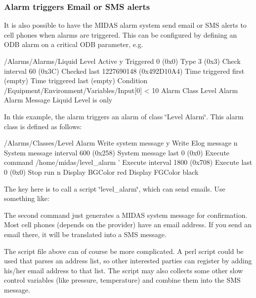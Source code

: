 \par


\par
\hypertarget{RC_customize_ODB_RC_alarms_email}{}\subsubsection{Alarm triggers Email or SMS alerts}\label{RC_customize_ODB_RC_alarms_email}
It is also possible to have the MIDAS alarm system send email or SMS alerts to cell phones when alarms are triggered. This can be configured by defining an ODB alarm on a critical ODB parameter, e.g. 
\begin{DoxyCode}
/Alarms/Alarms/Liquid Level
Active                   y
Triggered                0 (0x0)
Type                     3 (0x3)
Check interval          60 (0x3C)
Checked last    1227690148 (0x492D10A4)
Time triggered first    (empty)
Time triggered last     (empty)
Condition               /Equipment/Environment/Variables/Input[0] < 10
Alarm Class             Level Alarm
Alarm Message           Liquid Level is only %
\end{DoxyCode}
 In this example, the alarm triggers an alarm of class \char`\"{}Level Alarm\char`\"{}. This alarm class is defined as follows: 
\begin{DoxyCode}
/Alarms/Classes/Level Alarm
Write system message    y
Write Elog message      n
System message interval 600 (0x258)
System message last     0 (0x0)
Execute command         /home/midas/level_alarm '%
Execute interval        1800 (0x708)
Execute last            0 (0x0)
Stop run                n
Display BGColor         red
Display FGColor         black
\end{DoxyCode}
 The key here is to call a script \char`\"{}level\_\-alarm\char`\"{}, which can send emails. Use something like: 
 The second command just generates a MIDAS system message for confirmation. Most cell phones (depends on the provider) have an email address. If you send an email there, it will be translated into a SMS message.

The script file above can of course be more complicated. A perl script could be used that parses an address list, so other interested parties can register by adding his/her email address to that list. The script may also collects some other slow control variables (like pressure, temperature) and combine them into the SMS message.

